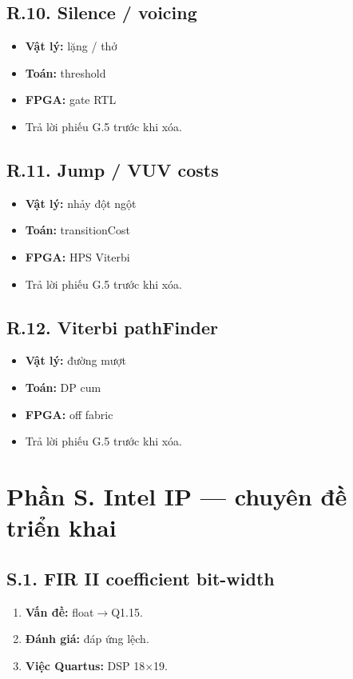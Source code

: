 \subsection*{R.10. Silence / voicing}
\begin{itemize}\setlength{\itemsep}{2pt}
\item \textbf{Vật lý:} lặng / thở
\item \textbf{Toán:} threshold
\item \textbf{FPGA:} gate RTL
\item Trả lời phiếu G.5 trước khi xóa.
\end{itemize}
\subsection*{R.11. Jump / VUV costs}
\begin{itemize}\setlength{\itemsep}{2pt}
\item \textbf{Vật lý:} nhảy đột ngột
\item \textbf{Toán:} transitionCost
\item \textbf{FPGA:} HPS Viterbi
\item Trả lời phiếu G.5 trước khi xóa.
\end{itemize}
\subsection*{R.12. Viterbi pathFinder}
\begin{itemize}\setlength{\itemsep}{2pt}
\item \textbf{Vật lý:} đường mượt
\item \textbf{Toán:} DP cum
\item \textbf{FPGA:} off fabric
\item Trả lời phiếu G.5 trước khi xóa.
\end{itemize}
\newpage\section*{Phần S. Intel IP --- chuyên đề triển khai}
\subsection*{S.1. FIR II coefficient bit-width}
\begin{enumerate}\setlength{\itemsep}{2pt}
\item \textbf{Vấn đề:} float$\to$Q1.15.
\item \textbf{Đánh giá:} đáp ứng lệch.
\item \textbf{Việc Quartus:} DSP 18$\times$19.
\end{enumerate}

